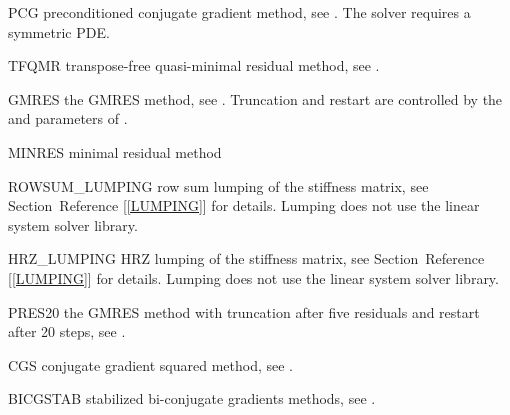 \begin{memberdesc}[SolverOptions]{PCG}
preconditioned conjugate gradient method, see .
The solver requires a symmetric PDE.
\end{memberdesc}

\begin{memberdesc}[SolverOptions]{TFQMR}
transpose-free quasi-minimal residual method, see .
\end{memberdesc}

\begin{memberdesc}[SolverOptions]{GMRES}
the GMRES method, see .
Truncation and restart are controlled by the  and 
parameters of .
\end{memberdesc}

\begin{memberdesc}[SolverOptions]{MINRES}
minimal residual method
\end{memberdesc}

\begin{memberdesc}[SolverOptions]{ROWSUM_LUMPING}
row sum lumping of the stiffness matrix, see Section~Reference [\ref{LUMPING}] for details.
Lumping does not use the linear system solver library.
\end{memberdesc}

\begin{memberdesc}[SolverOptions]{HRZ_LUMPING}
HRZ lumping of the stiffness matrix, see Section~Reference [\ref{LUMPING}] for details.
Lumping does not use the linear system solver library.
\end{memberdesc}

\begin{memberdesc}[SolverOptions]{PRES20}
the GMRES method with truncation after five residuals and restart after
20 steps, see .
\end{memberdesc}

\begin{memberdesc}[SolverOptions]{CGS}
conjugate gradient squared method, see .
\end{memberdesc}

\begin{memberdesc}[SolverOptions]{BICGSTAB}
stabilized bi-conjugate gradients methods, see .
\end{memberdesc}

